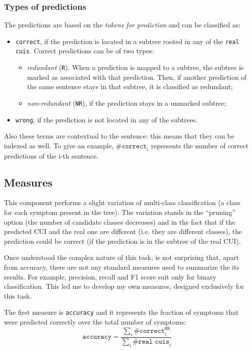 \subsubsection{Types of predictions}
The predictions are based on the \textit{tokens for prediction} and can be classified as:
\begin{itemize}
  \item \texttt{correct}, if the prediction is located in a subtree rooted in any of the \texttt{real cuis}. Correct predictions can be of two types:
    \begin{itemize}
      \item \textit{redundant} (\texttt{R}). When a prediction is mapped to a subtree, the subtree is marked as associated with that prediction. Then, if another prediction of the same sentence stays in that subtree, it is classified as redundant;
      \item \textit{non-redundant} (\texttt{NR}), if the prediction stays in a unmarked subtree;
    \end{itemize}
  \item \texttt{wrong}, if the prediction is not located in any of the subtrees.
\end{itemize}

Also these terms are contextual to the sentence: this means that they can be indexed as well. To give an example, $\texttt{\#correct}_{i}$ represents the number of correct predictions of the i-th sentence.

\subsection{Measures}
This component performs a slight variation of multi-class classification (a class for each symptom present in the tree). The variation stands in the ``pruning'' option (the number of candidate classes decreases) and in the fact that if the predicted CUI and the real one are different (i.e. they are different classes), the prediction could be correct (if the prediction is in the subtree of the real CUI).

Once understood the complex nature of this task, is not surprising that, apart from accuracy, there are not any standard measures used to summarize the its results. For example, precision, recall and F1 score suit only for binary classification. This led me to develop my own measures, designed exclusively for this task.

The first measure is \texttt{accuracy} and it represents the fraction of symptoms that were predicted correctly over the total number of symptoms:
\begin{equation}
\texttt{accuracy} = \frac{\sum_{i}{\texttt{\#correct}_{i}^{\texttt{NR}}}}{\sum_{i}{\texttt{\#real cuis}_{i}}}
\end{equation}

